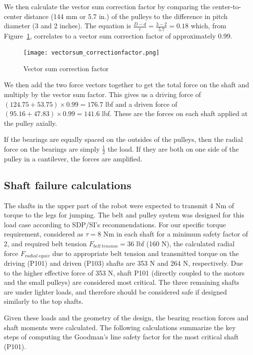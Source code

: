 \documentclass{report}
\begin{document}
We then calculate the vector sum correction factor by comparing the center-to-center distance (144 mm or 5.7 in.) of the pulleys to the difference in pitch diameter (3 and 2 inches). The equation is $\frac{D-d}{c} = \frac{3-2}{5.7} = 0.18$ which, from Figure~\ref{fig:vectorsum_correctionfactor}, correlates to a vector sum correction factor of approximately 0.99.

\begin{figure}[H]
	\centering
	\texttt{[image: vectorsum\_correctionfactor.png]}
	\caption{Vector sum correction factor}
	\label{fig:vectorsum_correctionfactor}
\end{figure}

We then add the two force vectors together to get the total force on the shaft and multiply by the vector sum factor. This gives us a driving force of $(124.75+53.75)\times0.99 = 176.7$ lbf and a driven force of $(95.16+47.83)\times0.99 = 141.6$ lbf. These are the forces on each shaft applied at the pulley axially.

If the bearings are equally spaced on the outsides of the pulleys, then the radial force on the bearings are simply $\frac{1}{2}$ the load. If they are both on one side of the pulley in a cantilever, the forces are amplified.

\subsection[Shaft failure calculations]{Shaft failure calculations}

The shafts in the upper part of the robot were expected to transmit 4 Nm of torque to the legs for jumping. The belt and pulley system was designed for this load case according to SDP/SI's recommendations. For our specific torque requirement, considered as $\tau = 8$ Nm in each shaft for a minimum safety factor of 2, and required belt tension $F_{belt\ tension} = 36$ lbf (160 N), the calculated radial force $F_{radial\ equiv}$ due to appropriate belt tension and transmitted torque on the driving (P101) and driven (P103)  shafts are 353 N and 264 N, respectively. Due to the higher effective force of 353 N, shaft P101 (directly coupled to the motors and the small pulleys) are considered most critical. The three remaining shafts are under lighter loads, and therefore should be considered safe if designed similarly to the top shafts.

Given these loads and the geometry of the design, the bearing reaction forces and shaft moments were calculated. The following calculations summarize the key steps of computing the Goodman's line safety factor for the most critical shaft (P101).
\end{document}
